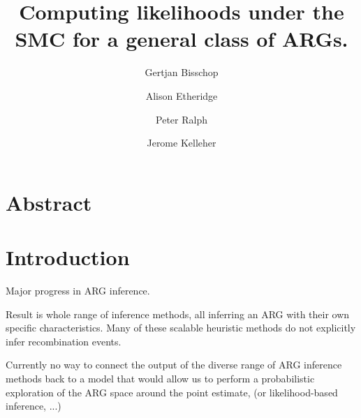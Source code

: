 \documentclass{article}
\begin{document}
\linenumbers
\title{Computing likelihoods under the SMC for a general class of ARGs.}

\author[1, $\dagger$]{Gertjan Bisschop}

\author[2]{Alison Etheridge}
\author[3]{Peter Ralph}

\author[1]{Jerome Kelleher}

\maketitle


\section{Abstract}

\section{Introduction}


Major progress in ARG inference. 

Result is whole range of inference methods, all inferring an ARG with their own specific 
characteristics.
Many of these scalable heuristic methods do not explicitly infer recombination events.


Currently no way to connect the output of the diverse range of ARG inference methods back 
to a model that would allow us to perform a probabilistic exploration of the 
ARG space around the point estimate, (or likelihood-based inference, ...)




\end{document}
